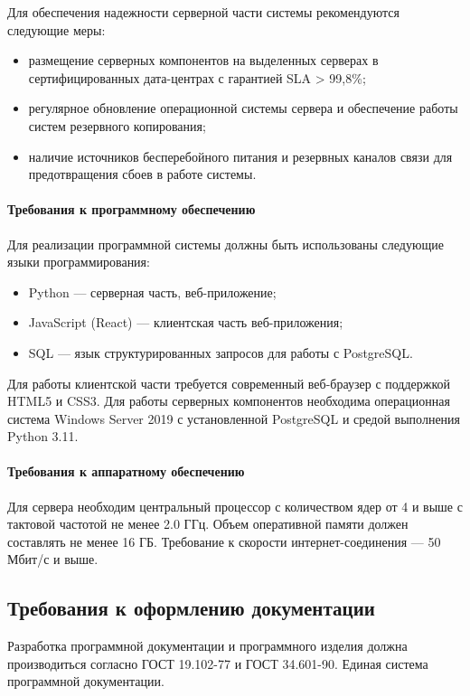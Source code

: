 Для обеспечения надежности серверной части системы рекомендуются следующие меры:
\begin{itemize}
	\item размещение серверных компонентов на выделенных серверах в сертифицированных дата-центрах с гарантией SLA > 99,8\%;
	\item регулярное обновление операционной системы сервера и обеспечение работы систем резервного копирования;
	\item наличие источников бесперебойного питания и резервных каналов связи для предотвращения сбоев в работе системы.
\end{itemize}


\paragraph{Требования к программному обеспечению}

Для реализации программной системы должны быть использованы следующие языки программирования:

\begin{itemize}
	\item Python — серверная часть, веб-приложение;
	\item JavaScript (React) — клиентская часть веб-приложения;
	\item SQL — язык структурированных запросов для работы с PostgreSQL.
\end{itemize}

Для работы клиентской части требуется современный веб-браузер с поддержкой HTML5 и CSS3.
Для работы серверных компонентов необходима операционная система Windows Server 2019 с установленной PostgreSQL и средой выполнения Python 3.11.

\paragraph{Требования к аппаратному обеспечению}

Для сервера необходим центральный процессор с количеством ядер от 4 и выше с тактовой частотой не менее 2.0 ГГц. Объем оперативной памяти должен составлять не менее 16 ГБ.
Требование к скорости интернет-соединения — 50 Мбит/с и выше.

\subsection{Требования к оформлению документации}

Разработка программной документации и программного изделия должна производиться согласно ГОСТ 19.102-77 и ГОСТ 34.601-90. Единая система программной документации.
